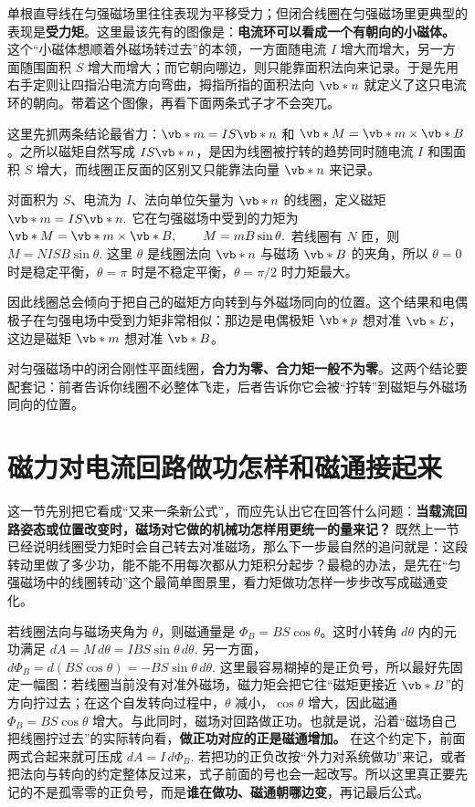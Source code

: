 \documentclass[lang=cn,11pt]{elegantbook}
\newcommand{\bridge}[1]{\begin{note}#1\end{note}}
\begin{document}
单根直导线在匀强磁场里往往表现为平移受力；但闭合线圈在匀强磁场里更典型的表现是\textbf{受力矩}。这里最该先有的图像是：\textbf{电流环可以看成一个有朝向的小磁体。} 这个“小磁体想顺着外磁场转过去”的本领，一方面随电流 \(I\) 增大而增大，另一方面随围面积 \(S\) 增大而增大；而它朝向哪边，则只能靠面积法向来记录。于是先用右手定则让四指沿电流方向弯曲，拇指所指的面积法向 \(\vb*{n}\) 就定义了这只电流环的朝向。带着这个图像，再看下面两条式子才不会突兀。\bridge{这里先抓两条结论最省力：\(\vb*{m}=IS\vb*{n}\) 和 \(\vb*{M}=\vb*{m}\times\vb*{B}\)。之所以磁矩自然写成 \(IS\vb*{n}\)，是因为线圈被拧转的趋势同时随电流 \(I\) 和围面积 \(S\) 增大，而线圈正反面的区别又只能靠法向量 \(\vb*{n}\) 来记录。} 对面积为 \(S\)、电流为 \(I\)、法向单位矢量为 \(\vb*{n}\) 的线圈，定义磁矩
 \(\vb*{m}=IS\vb*{n}.\) 
它在匀强磁场中受到的力矩为
 \(\vb*{M}=\vb*{m}\times \vb*{B}, \qquad M=mB\sin\theta.\) 
若线圈有 \(N\) 匝，则
 \(M=NISB\sin\theta.\) 
这里 \(\theta\) 是线圈法向 \(\vb*{n}\) 与磁场 \(\vb*{B}\) 的夹角，所以 \(\theta=0\) 时是稳定平衡，\(\theta=\pi\) 时是不稳定平衡，\(\theta=\pi/2\) 时力矩最大。

因此线圈总会倾向于把自己的磁矩方向转到与外磁场同向的位置。这个结果和电偶极子在匀强电场中受到力矩非常相似：那边是电偶极矩 \(\vb*{p}\) 想对准 \(\vb*{E}\)，这边是磁矩 \(\vb*{m}\) 想对准 \(\vb*{B}\)。

\begin{remark}
对匀强磁场中的闭合刚性平面线圈，\textbf{合力为零、合力矩一般不为零}。这两个结论要配套记：前者告诉你线圈不必整体飞走，后者告诉你它会被“拧转”到磁矩与外磁场同向的位置。
\end{remark}

\section{磁力对电流回路做功怎样和磁通接起来}

这一节先别把它看成“又来一条新公式”，而应先认出它在回答什么问题：\textbf{当载流回路姿态或位置改变时，磁场对它做的机械功怎样用更统一的量来记？} 既然上一节已经说明线圈受力矩时会自己转去对准磁场，那么下一步最自然的追问就是：这段转动里做了多少功，能不能不用每次都从力矩积分起步？最稳的办法，是先在“匀强磁场中的线圈转动”这个最简单图景里，看力矩做功怎样一步步改写成磁通变化。

若线圈法向与磁场夹角为 \(\theta\)，则磁通量是 \(\Phi_B=BS\cos\theta\)。这时小转角 \(d\theta\) 内的元功满足
 \(dA=M\,d\theta=IBS\sin\theta\,d\theta.\) 
另一方面，
 \(d\Phi_B=d(BS\cos\theta)=-BS\sin\theta\,d\theta.\) 
这里最容易糊掉的是正负号，所以最好先固定一幅图：若线圈当前没有对准外磁场，磁力矩会把它往“磁矩更接近 \(\vb*{B}\)”的方向拧过去；在这个自发转向过程中，\(\theta\) 减小，\(\cos\theta\) 增大，因此磁通 \(\Phi_B=BS\cos\theta\) 增大。与此同时，磁场对回路做正功。也就是说，沿着“磁场自己把线圈拧过去”的实际转向看，\textbf{做正功对应的正是磁通增加。} 在这个约定下，前面两式合起来就可压成
 \(dA=I\,d\Phi_B.\) 
若把功的正负改按“外力对系统做功”来记，或者把法向与转向的约定整体反过来，式子前面的号也会一起改写。所以这里真正要先记的不是孤零零的正负号，而是\textbf{谁在做功、磁通朝哪边变}，再记最后公式。
\end{document}
